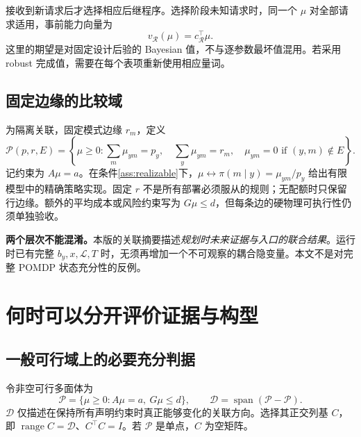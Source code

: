 \documentclass[UTF8,11pt,a4paper,fontset=fandol]{ctexart}
\numberwithin{equation}{section}
\theoremstyle{definition}
\DeclareMathOperator{\range}{range}
\DeclareMathOperator{\spanop}{span}
\begin{document}
接收到新请求后才选择相应后继程序。选择阶段未知请求时，同一个 $\mu$ 对全部请求适用，事前能力向量为
\begin{equation}
v_{\mathcal R}(\mu)=c_{\mathcal R}^{\top}\mu.
\label{eq:value}
\end{equation}
这里的期望是对固定设计后验的 Bayesian 值，不与逐参数最坏值混用。若采用 robust 完成值，需要在每个表项重新使用相应量词。

\subsection{固定边缘的比较域}
为隔离关联，固定模式边缘 $r_m$，定义
\begin{equation}
\mathcal P(p,r,E)=\left\{\mu\ge0:
\sum_m\mu_{ym}=p_y,\quad
\sum_y\mu_{ym}=r_m,\quad
\mu_{ym}=0\text{ if }(y,m)\notin E\right\}.
\label{eq:transport}
\end{equation}
记约束为 $A\mu=a$。在条件\ref{ass:realizable}下，$\mu\leftrightarrow\pi(m\mid y)=\mu_{ym}/p_y$ 给出有限模型中的精确策略实现。固定 $r$ 不是所有部署必须服从的规则；无配额时只保留行边缘。额外的平均成本或风险约束写为 $G\mu\le d$，但每条边的硬物理可执行性仍须单独验收。

\begin{scopebox}
\textbf{两个层次不能混淆。}本版的关联摘要描述\emph{规划时未来证据与入口的联合结果}。运行时已有完整 $b_y,x,\mathcal L,T$ 时，无须再增加一个不可观察的耦合隐变量。本文不是对完整 POMDP 状态充分性的反例。
\end{scopebox}

\section{何时可以分开评价证据与构型}
\label{sec:separation}

\subsection{一般可行域上的必要充分判据}
令非空可行多面体为
\begin{equation}
\mathcal P=\{\mu\ge0:A\mu=a,\ G\mu\le d\},\qquad
\mathcal D=\spanop(\mathcal P-\mathcal P).
\label{eq:diffspace}
\end{equation}
$\mathcal D$ 仅描述在保持所有声明约束时真正能够变化的关联方向。选择其正交列基 $C$，即 $\range C=\mathcal D$、$C^\top C=I$。若 $\mathcal P$ 是单点，$C$ 为空矩阵。
\end{document}

